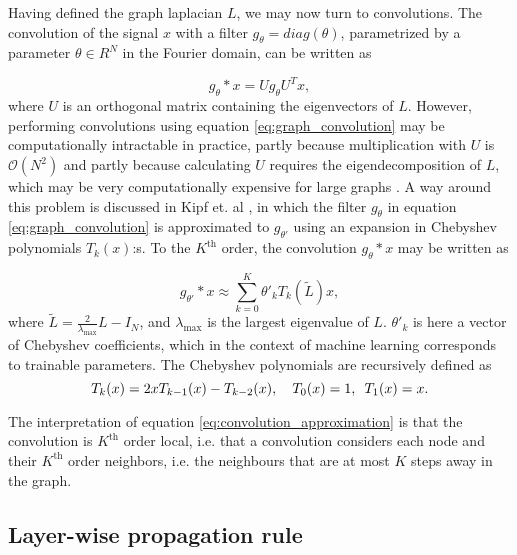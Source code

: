 Having defined the graph laplacian $L$, we may now turn to convolutions. The convolution of the signal $x$ with a filter $g_\theta = diag(\theta)$, parametrized by a parameter $\theta \in R^N$ in the Fourier domain, can be written as 

\begin{equation}
    g_\theta * x = U g_\theta U^T x,
    \label{eq:graph_convolution}
\end{equation}
where $U$ is an orthogonal matrix containing the eigenvectors of $L$. However, performing convolutions using equation \ref{eq:graph_convolution} may be computationally intractable in practice, partly because multiplication with $U$ is $\mathcal{O}(N^2)$ and partly because calculating $U$ requires the eigendecomposition of $L$, which may be very computationally expensive for large graphs \cite{kipf_semi_supervised}. A way around this problem is discussed in Kipf et. al \cite{kipf_semi_supervised}, in which the filter $g_\theta$ in equation \ref{eq:graph_convolution} is approximated to $g_{\theta'}$ using an expansion in Chebyshev polynomials $T_k(x)$:s. To the $K^{\text{th}}$ order, the convolution $g_\theta * x$ may be written as 

\begin{equation}
    g_{\theta'} * x \approx \sum_{k=0}^K \theta'_k T_k(\tilde{L})x,
    \label{eq:convolution_approximation}
\end{equation}
where $\tilde{L} =  \frac{2}{\lambda_{\text{max}}}L - I_N$, and $\lambda_{\text{max}}$ is the largest eigenvalue of $L$. $\theta'_k$ is here a vector of Chebyshev coefficients, which in the context of machine learning corresponds to trainable parameters. The Chebyshev polynomials are recursively defined as 
\begin{equation}
    T_k(x) = 2xT_{k-1}(x) - T_{k-2}(x), \hspace{10px} T_0(x) = 1, \hspace{5px} T_1(x) = x.
\end{equation}

The interpretation of equation \eqref{eq:convolution_approximation} is that the convolution is $K^{\text{th}}$ order local, i.e. that a convolution considers each node and their $K^{\text{th}}$ order neighbors, i.e. the neighbours that are at most $K$ steps away in the graph. 


\subsection{Layer-wise propagation rule}

